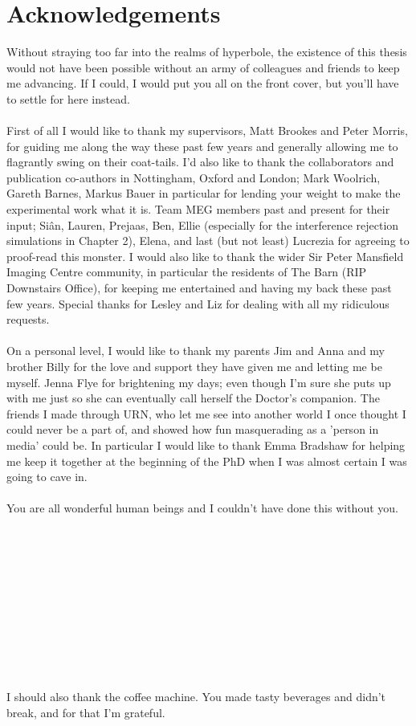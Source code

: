 \documentclass[a4paper,11pt,oneside]{book}
\begin{document}
 \chapter{Acknowledgements}
Without straying too far into the realms of hyperbole, the existence of this thesis would not have been possible without an army of colleagues and friends to keep me advancing. If I could, I would put you all on the front cover, but you'll have to settle for here instead. 
\\~\\
First of all I would like to thank my supervisors, Matt Brookes and Peter Morris, for guiding me along the way these past few years and generally allowing me to flagrantly swing on their coat-tails. I'd also like to thank the collaborators and publication co-authors in Nottingham, Oxford and London; Mark Woolrich, Gareth Barnes, Markus Bauer in particular for lending your weight to make the experimental work what it is. Team MEG members past and present for their input; Siân, Lauren, Prejaas, Ben, Ellie (especially for the interference rejection simulations in Chapter 2), Elena, and last (but not least) Lucrezia for agreeing to proof-read this monster. I would also like to thank the wider Sir Peter Mansfield Imaging Centre community, in particular the residents of The Barn (RIP Downstairs Office), for keeping me entertained and having my back these past few years. Special thanks for Lesley and Liz for dealing with all my ridiculous requests.
\\~\\
On a personal level, I would like to thank my parents Jim and Anna and my brother Billy for the love and support they have given me and letting me be myself. Jenna Flye for brightening my days; even though I'm sure she puts up with me just so she can eventually call herself the Doctor's companion. The friends I made through URN, who let me see into another world I once thought I could never be a part of, and showed how fun masquerading as a 'person in media' could be. In particular I would like to thank Emma Bradshaw for helping me keep it together at the beginning of the PhD when I was almost certain I was going to cave in.  
\\~\\
You are all wonderful human beings and I couldn't have done this without you.
\\~\\
\\~\\
\\~\\
\\~\\
\\~\\
\\~\\
I should also thank the coffee machine. You made tasty beverages and didn't break, and for that I'm grateful. 
\end{document}
